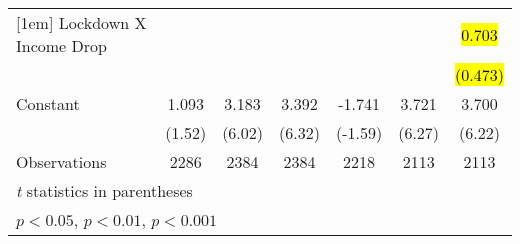 \begin{table*}[!ht]
\begin{adjustwidth}{-1.25in}{0in}
\begin{tabular}{l*{6}{c}}
[1em]
Lockdown X Income Drop&                     &                     &                     &                     &                     &           \hl{0.703}         \\
                    &                     &                     &                     &                     &                     &         \hl{(0.473)}         \\
[1em]
Constant            &       1.093         &       3.183\sym{***}&       3.392\sym{***}&      -1.741         &       3.721\sym{***}&       3.700\sym{***}\\
                    &      (1.52)         &      (6.02)         &      (6.32)         &     (-1.59)         &      (6.27)         &      (6.22)         \\
\hline
Observations        &        2286         &        2384         &        2384         &        2218         &        2113         &        2113         \\
\hline\hline
\multicolumn{7}{l}{\footnotesize \textit{t} statistics in parentheses}\\
\multicolumn{7}{l}{\footnotesize \sym{*} \(p<0.05\), \sym{**} \(p<0.01\), \sym{***} \(p<0.001\)}\\
\end{tabular}
\end{adjustwidth}
\end{table*}
